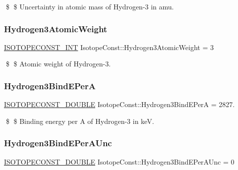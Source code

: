 \$ \$ Uncertainty in atomic mass of Hydrogen-\/3 in amu. \mbox{\label{group___isotope_const-_hydrogen-_h3_gae3fae7359715f708bf35af8e11c7ee96}} 
\subsubsection{\texorpdfstring{Hydrogen3\+Atomic\+Weight}{Hydrogen3AtomicWeight}}
{\footnotesize\ttfamily \mbox{\hyperlink{group___isotope_const-_macros_ga5f18360b3e99483a35c32d789e62621c}{I\+S\+O\+T\+O\+P\+E\+C\+O\+N\+S\+T\+\_\+\+I\+NT}} Isotope\+Const\+::\+Hydrogen3\+Atomic\+Weight = 3}

\$ \$ Atomic weight of Hydrogen-\/3. \mbox{\label{group___isotope_const-_hydrogen-_h3_ga61e8c77eb02d5f0decfc9ca3cc9ea208}} 
\subsubsection{\texorpdfstring{Hydrogen3\+Bind\+E\+PerA}{Hydrogen3BindEPerA}}
{\footnotesize\ttfamily \mbox{\hyperlink{group___isotope_const-_macros_ga8f45a7272ce02c0b4c65c44636ed719a}{I\+S\+O\+T\+O\+P\+E\+C\+O\+N\+S\+T\+\_\+\+D\+O\+U\+B\+LE}} Isotope\+Const\+::\+Hydrogen3\+Bind\+E\+PerA = 2827.}

\$ \$ Binding energy per A of Hydrogen-\/3 in keV. \mbox{\label{group___isotope_const-_hydrogen-_h3_ga0dc01431289fa5c53936cee0c0607fc3}} 
\subsubsection{\texorpdfstring{Hydrogen3\+Bind\+E\+Per\+A\+Unc}{Hydrogen3BindEPerAUnc}}
{\footnotesize\ttfamily \mbox{\hyperlink{group___isotope_const-_macros_ga8f45a7272ce02c0b4c65c44636ed719a}{I\+S\+O\+T\+O\+P\+E\+C\+O\+N\+S\+T\+\_\+\+D\+O\+U\+B\+LE}} Isotope\+Const\+::\+Hydrogen3\+Bind\+E\+Per\+A\+Unc = 0}


